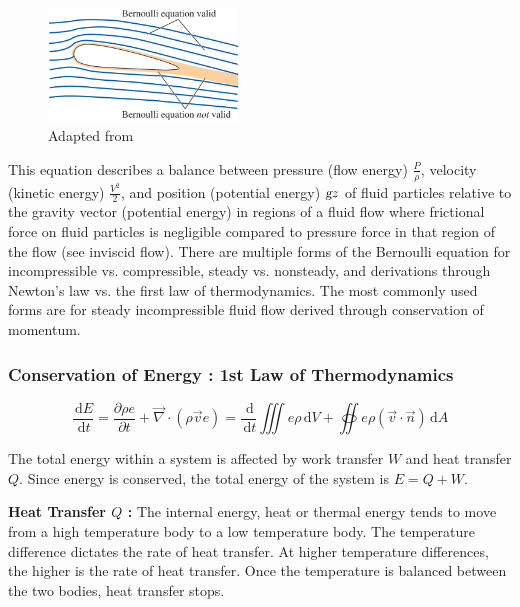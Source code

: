 \documentclass{article}
\newcommand{\ud}{\,\mathrm{d}}
\begin{document}
\begin{figure}[h!]
\centering
\includegraphics[width=0.45\textwidth]{./img/bermoulliInviscidRegions.png}
\caption{Adapted from \cite{White2011}}
\label{fig:universe}
\end{figure}

This equation describes a balance between pressure (flow energy) $\displaystyle \frac{P}{\rho}$, velocity (kinetic energy) $\displaystyle \frac{V^2}{2}$, and position (potential energy) $\textsl{g} z$ of fluid particles relative to the gravity vector (potential energy) in regions of a fluid flow where frictional force on fluid particles is negligible compared to pressure force in that region of the flow (see inviscid flow). There are multiple forms of the Bernoulli equation for incompressible vs. compressible, steady vs. nonsteady, and derivations through Newton’s law vs. the first law of thermodynamics. The most commonly used forms are for steady incompressible fluid flow derived through conservation of momentum.


\subsubsection*{Conservation of Energy : 1st Law of Thermodynamics}

\begin{equation}
\frac{\ud E}{\ud t} = \frac{\partial \rho e}{ \partial t} + \vec{\nabla} \cdot (\rho \vec{v} e) = \frac{\ud}{\ud t} \iiint e \rho \ud V + \oiint e \rho (\vec{v} \cdot \vec{n}) \ud A
\label{eq_conservationOfEnergy}
\end{equation}

The total energy within a system is affected by work transfer $W$ and heat transfer $Q$. Since energy is conserved, the total energy of the system is $\displaystyle E = Q + W$. \cite{Moukalled2016, White2011}

\textbf{Heat Transfer $Q$ :} The internal energy, heat or thermal energy tends to move from a high temperature body to a low temperature body. The temperature difference dictates the rate of heat transfer. At higher temperature differences, the higher is the rate of heat transfer. Once the temperature is balanced between the two bodies, heat transfer stops.
\end{document}
